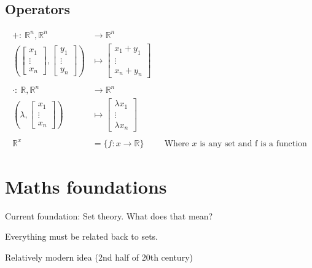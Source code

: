 \documentclass[a4paper,12pt]{article}
\begin{document}
\subsection*{Operators}
\begin{align*}
+: \> \mathbb{R}^n, \mathbb{R}^n & \rightarrow \mathbb{R}^n \\
(\begin{bmatrix} x_1 \\ \vdots \\ x_n \end{bmatrix}, \begin{bmatrix} y_1 \\ \vdots \\ y_n \end{bmatrix}) & \mapsto \begin{bmatrix} x_1 + y_1 \\ \vdots \\ x_n + y_n \end{bmatrix} \\\\
\cdot: \> \mathbb{R}, \mathbb{R}^n & \rightarrow \mathbb{R}^n \\
(\lambda, \begin{bmatrix} x_1 \\ \vdots \\ x_n \end{bmatrix}) & \mapsto \begin{bmatrix} \lambda x_1 \\ \vdots \\ \lambda x_n \end{bmatrix} \\\\
\mathbb{R}^x & = \{f: x \rightarrow \mathbb{R}\} \hspace{1cm} \text{Where $x$ is any set and f is a function}
\end{align*}
\section*{Maths foundations}
Current foundation: Set theory. What does that mean?
\begin{list1}
	\item Everything must be related back to sets.
	\item Relatively modern idea (2nd half of 20th century)
\end{list1}
\end{document}
